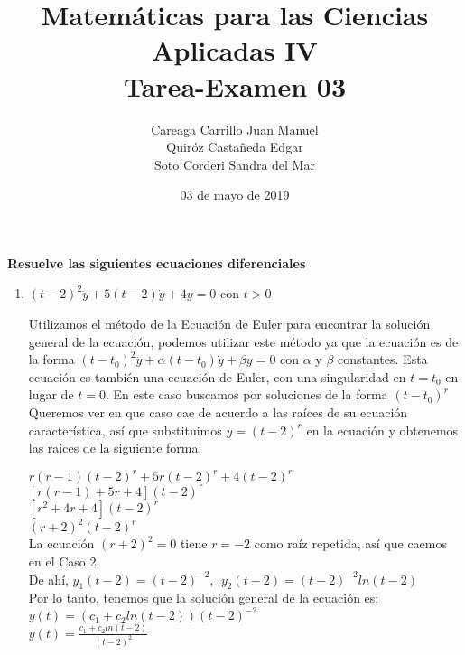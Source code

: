 \documentclass{article}
\title{
    Matemáticas para las Ciencias Aplicadas IV\\
    Tarea-Examen 03 
}
\author{
    Careaga Carrillo Juan Manuel \\
    Quiróz Castañeda Edgar \\
    Soto Corderi Sandra del Mar
}
\date{
    03 de mayo de 2019
}
\begin{document}
    \maketitle
    {\bf Resuelve las siguientes ecuaciones diferenciales}
    \begin{enumerate}
        
        \item {
        	$(t - 2)^2 \ddot y + 5(t-2)\dot y+4y=0$ con $t > 0$ \\
        	
        	\color{azul}
        	
        	Utilizamos el método de la Ecuación de Euler para encontrar la solución general de la ecuación, podemos utilizar este método ya que la ecuación es de la forma $(t - t_0)^2\ddot{y} + \alpha (t - t_0) \dot{y} + \beta y = 0$ con $\alpha$ y $\beta$ constantes. Esta ecuación es también una ecuación de Euler, con una singularidad en $t = t_0$ en lugar de $t = 0$. En este caso buscamos por soluciones de la forma $(t - t_0)^r$\\
        	
        	Queremos ver en que caso cae de acuerdo a las raíces de su ecuación característica, así que substituimos $y = (t-2)^r$ en la ecuación y obtenemos las raíces de la siguiente forma:
        	
        	$r(r -1)(t -2)^r + 5r(t-2)^r + 4(t-2)^r$\\
        	$[r(r-1) + 5r + 4] (t-2)^r$\\
        	$[r^2 + 4r + 4] (t-2)^r$\\
        	$(r+2)^2(t-2)^r$\\
        	
        	La ecuación $(r+2)^2 = 0$ tiene $r = -2$ como raíz repetida, así que caemos en el Caso 2.\\
        	De ahí, $y_1(t-2) = (t-2)^{-2}, \ \  y_2(t-2) = (t-2)^{-2}ln(t-2)$\\
        	
        	Por lo tanto, tenemos que la solución general de la ecuación es:\\
        	
        	$y(t) = (c_1 + c_2 ln(t-2))(t-2)^{-2} $ \\
        	
        	$y(t) = \frac{c_1 + c_2 ln(t-2)}{(t-2)^2} $\\
        	
        	
        	
}
\end{enumerate}
\end{document}
